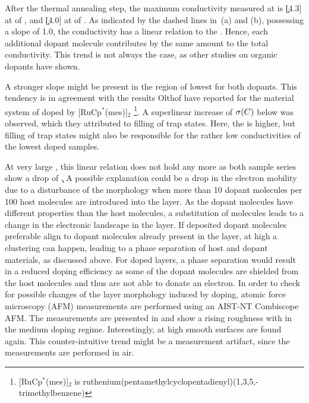 After the thermal annealing step, the maximum conductivity measured at \T[30] is \c[4.3] at \C[0.045] of \CrPd, and \c[4.0] at  of \WPd. As indicated by the dashed lines in \,(a) and (b), possessing a slope of 1.0, the conductivity has a linear relation to the \CLong. Hence, each additional dopant molecule contributes by the same amount to the total conductivity. This trend is not always the case, as other studies on organic dopants have shown\cite{Maennig2001,Gregg2004Review}.

A stronger slope might be present in the region of lowest \CLongs for both dopants. This tendency is in agreement with the results Olthof\etal\cite{Olthof2012} have reported for the material system of \CS doped by [RuCp$^*$(mes)]$_2$%
\footnote{[RuCp$^*$(mes)]$_2$ is ruthenium(pentamethylcyclopentadienyl)(1,3,5,-trimethylbenzene)}. A superlinear increase of $\c(\C)$ below  was observed, which they attributed to filling of trap states. Here, the \CLong is higher, but filling of trap states might also be responsible for the rather low conductivities of the lowest doped samples.

At very large \CLongs {}, this linear relation does not hold any more as both sample series show a drop of \c. A possible explanation could be a drop in the electron mobility due to a disturbance of the morphology\cite{Kleemann2012a} when more than 10 dopant molecules per 100 host molecules are introduced into the layer.
As the dopant molecules have different properties than the host molecules, a substitution of molecules leads to a change in the electronic landscape in the layer\cite{Mityashin2012a}.
If deposited dopant molecules preferable align to dopant molecules already present in the layer, at high \C a clustering can happen, leading to a phase separation of host and dopant materials, as discussed above.
For doped layers, a phase separation would result in a reduced doping efficiency as some of the dopant molecules are shielded from the host molecules and thus are not able to donate an electron\cite{Mityashin2012a}. In order to check for possible changes of the layer morphology induced by doping, atomic force microscopy (AFM) measurements are performed using an AIST-NT Combiscope AFM. The measurements are presented in  and show a rising roughness with \C in the medium doping regime. Interestingly, at high \C smooth surfaces are found again. This counter-intuitive trend might be a measurement artifact, since the measurements are performed in air.

